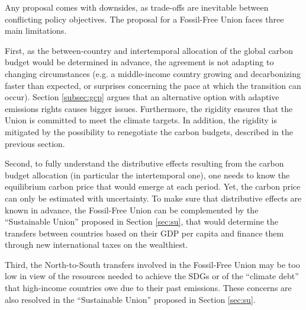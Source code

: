 \documentclass[12pt,english]{article}
\begin{document}
Any proposal comes with downsides, as trade-offs are inevitable between conflicting policy objectives. The proposal for a Fossil-Free Union faces three main limitations. 

First, as the between-country and intertemporal allocation of the global carbon budget would be determined in advance, the agreement is not adapting to changing circumstances (e.g. a middle-income country growing and decarbonizing faster than expected, or surprises concerning the pace at which the transition can occur). Section \ref{subsec:gcp} argues that an alternative option with adaptive emissions rights causes bigger issues. Furthermore, the rigidity ensures that the Union is committed to meet the climate targets. In addition, the rigidity is mitigated by the possibility to renegotiate the carbon budgets, described in the previous section. 

Second, to fully understand the distributive effects resulting from the carbon budget allocation (in particular the intertemporal one), one needs to know the equilibrium carbon price that would emerge at each period. Yet, the carbon price can only be estimated with uncertainty. To make sure that distributive effects are known in advance, the Fossil-Free Union can be complemented by the ``Sustainable Union'' proposed in Section \ref{sec:su}, that would determine the transfers between countries based on their GDP per capita and finance them through new international taxes on the wealthiest.

Third, the North-to-South transfers involved in the Fossil-Free Union may be too low in view of the resources needed to achieve the SDGs or of the ``climate debt'' that high-income countries owe due to their past emissions. These concerns are also resolved in the ``Sustainable Union'' proposed in Section \ref{sec:su}.



\end{document}
